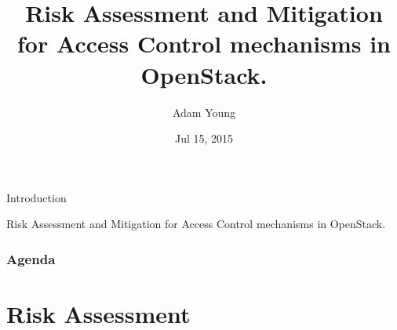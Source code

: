 \documentclass{beamer}
\title[OpenStack Liberty Keystone Midcycle ]{ Risk Assessment and Mitigation for Access Control mechanisms in OpenStack.
}
\author{Adam Young}
\institute{Red Hat Identity Management Team}
\date{Jul 15, 2015}
\begin{document}


\begin{frame}
  \titlepage
\end{frame}

\begin{frame}{Introduction}
  \begin{center}
    \begin{exampleblock}{}
      Risk Assessment and Mitigation for Access Control mechanisms in OpenStack.
    \end{exampleblock}
  \end{center}
\end{frame}

\begin{frame}
  \frametitle{Agenda}
  \tableofcontents
\end{frame}


\section{Risk Assessment}
\end{document}
